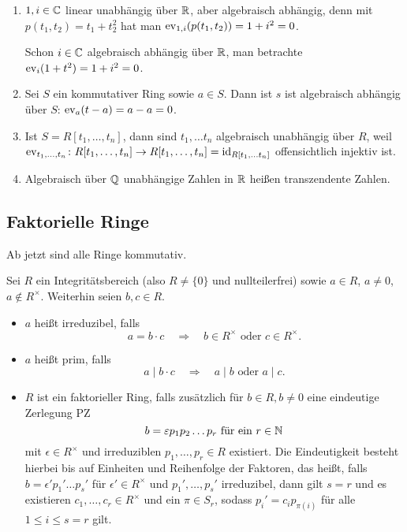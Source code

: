\documentclass[12pt,a4paper]{scrartcl}
\begin{document}
\begin{bsp}
	\leavevmode
	\begin{enumerate}
		\item $1,i\in\mathbb C$ linear unabhängig über $\mathbb R$, aber algebraisch abhängig, denn mit $p(t_1,t_2) = t_1+t_2^2$ hat man $\operatorname{ev}_{1,i}(p(t_1,t_2)) = 1+i^2 = 0$.
		
		Schon $i\in \mathbb C$ algebraisch abhängig über $\mathbb R$, man betrachte $\operatorname{ev}_{i}(1+t^2) = 1+i^2  = 0$.
		\item Sei $S$ ein kommutativer Ring sowie $a\in S$. Dann ist $s$ ist algebraisch abhängig über $S$: $\operatorname{ev}_a(t-a) = a-a = 0$.
		\item Ist $S =R[t_1,\dots, t_n]$, dann sind $t_1,\dots t_n$ algebraisch unabhängig über $R$, weil $\operatorname{ev}_{t_1,\dots, t_n}\colon R[t_1,\dots,t_n]\to R[t_1,\dots, t_n] = \operatorname{id}_{R[t_1,\dots t_n]}$ offensichtlich injektiv ist.
		\item Algebraisch über $\mathbb Q$ unabhängige Zahlen in $\mathbb R$ heißen transzendente Zahlen.
	\end{enumerate}
\end{bsp}

\subsection{Faktorielle Ringe}
Ab jetzt sind alle Ringe kommutativ.
\begin{defi} Sei $R$ ein Integritätsbereich (also $R\neq\{0\}$ und nullteilerfrei) sowie $a\in R$, $a\neq 0$, $a\notin R^{\times}$. Weiterhin seien $b,c \in R$.
\begin{itemize}
	\item $a$ heißt irreduzibel, falls \[a = b\cdot c\quad\Longrightarrow\quad \text{$b \in R^{\times}$ oder $c\in R^{\times}$}.\]
	\item $a$ heißt prim, falls \[a \mid b\cdot c\quad\Longrightarrow\quad \text{$a \mid b$ oder $a \mid c$}.\]
	\item $R$ ist ein faktorieller Ring, falls zusätzlich für $b\in R, b\neq 0$ eine eindeutige Zerlegung \glqq PZ \grqq{}
	\[b = \varepsilon p_1p_2\dots p_r \text{ für ein $r\in\mathbb N$}\]
	mit $\epsilon\in R^{\times}$ und irreduziblen $p_1,\dots, p_r\in R$ existiert. Die Eindeutigkeit besteht hierbei bis auf Einheiten und Reihenfolge der Faktoren, das heißt, falls $b = \epsilon'p_1'\dots p_s'$ für $\epsilon'\in R^{\times}$ und $p_1',\dots, p_s'$ irreduzibel, dann gilt $s = r$ und es existieren $c_1,\dots, c_r\in R^{\times}$ und ein $\pi \in S_r$, sodass $p_i' = c_ip_{\pi(i)}$ für alle $1 \le i \le s=r$ gilt.
\end{itemize}
\end{defi}
\end{document}
